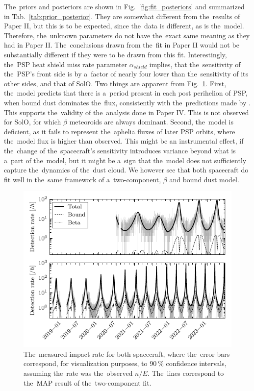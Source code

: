 The~priors and posteriors are shown in Fig.~\ref{fig:fit_posteriors} and summarized in Tab.~\ref{tab:prior_posterior}. They are somewhat different from the~results of Paper II, but this is to be expected, since the~data is different, as is the~model. Therefore, the~unknown parameters do not have the~exact same meaning as they had in Paper II. The~conclusions drawn from the~fit in Paper II would not be substantially different if they were to be drawn from this fit. Interestingly, the~PSP heat shield miss rate parameter $\alpha_{shield}$ implies, that the~sensitivity of the~PSP's front side is by a~factor of nearly four lower than the~sensitivity of its other sides, and that of SolO. Two things are apparent from Fig.~\ref{fig:fit_rate}. First, the~model predicts that there is a~period present in each post perihelion of PSP, when bound dust dominates the~flux, consistently with the~predictions made by \citep{szalay2020near,szalay2021collisional}. This supports the~validity of the~analysis done in Paper IV. This is not observed for SolO, for which $\beta$ meteoroids are always dominant. Second, the~model is deficient, as it fails to represent the~aphelia fluxes of later PSP orbits, where the~model flux is higher than observed. This might be an instrumental effect, if the~change of the~spacecraft's sensitivity introduces variance beyond what is a~part of the~model, but it might be a~sign that the~model does not sufficiently capture the~dynamics of the~dust cloud. We however see that both spacecraft do fit well in the~same framework of a~two-component, $\beta$ and bound dust model. 

\begin{figure}[hb]
 	\centering
 	\includegraphics[width=12cm]{figures/both_shield_rate_log.pdf}
 	\caption{The~measured impact rate for both spacecraft, where the~error bars correspond, for visualization purposes, to $\SI{90}{\%}$ confidence intervals, assuming the~rate was the~observed $n/E$. The~lines correspond to the~MAP result of the~two-component fit.}
 	\label{fig:fit_rate}
\end{figure}







